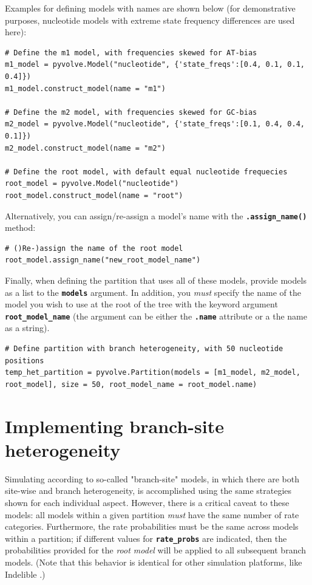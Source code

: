 \documentclass{article}
\newcommand{\code}[1]{\textbf{\texttt{\small{#1}}}}
\begin{document}
Examples for defining models with names are shown below (for demonstrative purposes, nucleotide models with extreme state frequency differences are used here):
\begin{lstlisting}
# Define the m1 model, with frequencies skewed for AT-bias
m1_model = pyvolve.Model("nucleotide", {'state_freqs':[0.4, 0.1, 0.1, 0.4]})
m1_model.construct_model(name = "m1")

# Define the m2 model, with frequencies skewed for GC-bias
m2_model = pyvolve.Model("nucleotide", {'state_freqs':[0.1, 0.4, 0.4, 0.1]})
m2_model.construct_model(name = "m2")

# Define the root model, with default equal nucleotide frequecies
root_model = pyvolve.Model("nucleotide")
root_model.construct_model(name = "root")
\end{lstlisting}

Alternatively, you can assign/re-assign a model's name with the \code{.assign\_name()} method:
\begin{lstlisting}
# ()Re-)assign the name of the root model
root_model.assign_name("new_root_model_name")
\end{lstlisting}



Finally, when defining the partition that uses all of these models, provide models as a list to the \code{models} argument. In addition, you \emph{must} specify the name of the model you wish to use at the root of the tree with the keyword argument \code{root\_model\_name} (the argument can be either the \code{.name} attribute or a the name as a string).
\begin{lstlisting}
# Define partition with branch heterogeneity, with 50 nucleotide positions
temp_het_partition = pyvolve.Partition(models = [m1_model, m2_model, root_model], size = 50, root_model_name = root_model.name) 
\end{lstlisting}



\section{Implementing branch-site heterogeneity}

Simulating according to so-called "branch-site" models, in which there are both site-wise and branch heterogeneity, is accomplished using the same strategies shown for each individual aspect. However, there is a critical caveat to these models: all models within a given partition \emph{must} have the same number of rate categories. Furthermore, the rate probabilities must be the same across models within a partition; if different values for \code{rate\_probs} are indicated, then the probabilities provided for the \emph{root model} will be applied to all subsequent branch models. (Note that this behavior is identical for other simulation platforms, like Indelible \citep{Fletcher2009}.)
\end{document}
